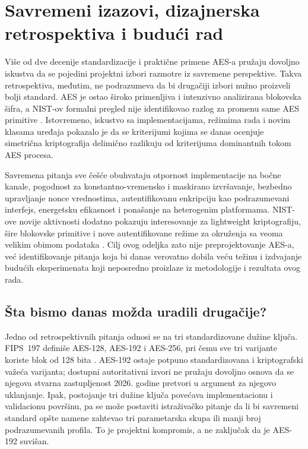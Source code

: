 \section{Savremeni izazovi, dizajnerska retrospektiva i budući rad}
\label{sec:izazovi}

Više od dve decenije standardizacije i praktične primene AES-a pružaju
dovoljno iskustva da se pojedini projektni izbori razmotre iz savremene
perspektive. Takva retrospektiva, međutim, ne podrazumeva da bi drugačiji
izbori nužno proizveli bolji standard. AES je ostao široko primenljiva i
intenzivno analizirana blokovska šifra, a NIST-ov formalni pregled nije
identifikovao razlog za promenu same AES primitive
\cite{MouhaDworkin2021AESReview}. Istovremeno, iskustvo sa implementacijama,
režimima rada i novim klasama uređaja pokazalo je da se kriterijumi kojima
se danas ocenjuje simetrična kriptografija delimično razlikuju od kriterijuma
dominantnih tokom AES procesa.

Savremena pitanja sve češće obuhvataju otpornost implementacije na bočne
kanale, pogodnost za konstantno-vremensko i maskirano izvršavanje,
bezbedno upravljanje nonce vrednostima, autentifikovanu enkripciju kao
podrazumevani interfejs, energetsku efikasnost i ponašanje na heterogenim
platformama. NIST-ove novije aktivnosti dodatno pokazuju interesovanje za
lightweight kriptografiju, šire blokovske primitive i nove autentifikovane
režime za okruženja sa veoma velikim obimom podataka
\cite{NISTSP800232,Turan2026SymmetricStandards}. Cilj ovog odeljka zato
nije preprojektovanje AES-a, već identifikovanje pitanja koja bi danas
verovatno dobila veću težinu i izdvajanje budućih eksperimenata koji
neposredno proizlaze iz metodologije i rezultata ovog rada.


\subsection{Šta bismo danas možda uradili drugačije?}

Jedno od retrospektivnih pitanja odnosi se na tri standardizovane dužine
ključa. FIPS~197 definiše AES-128, AES-192 i AES-256, pri čemu sve tri
varijante koriste blok od 128 bita
\cite{NISTFIPS197Update}. AES-192 ostaje potpuno standardizovana i
kriptografski važeća varijanta; dostupni autoritativni izvori ne pružaju
dovoljno osnova da se njegova stvarna zastupljenost 2026. godine pretvori
u argument za njegovo uklanjanje. Ipak, postojanje tri dužine ključa
povećava implementacionu i validacionu površinu, pa se može postaviti
istraživačko pitanje da li bi savremeni standard opšte namene zahtevao
tri parametarska skupa ili manji broj podrazumevanih profila. To je
projektni kompromis, a ne zaključak da je AES-192 suvišan.

